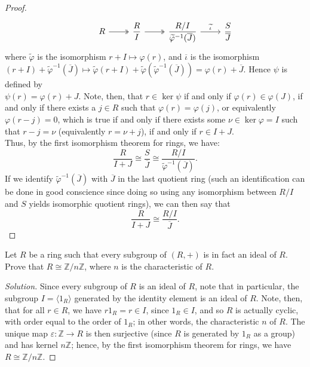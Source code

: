 \documentclass[12pt]{article}
\newenvironment{problem}[2][Problem]{\begin{trivlist}
\item[\hskip \labelsep {\bfseries #1}\hskip \labelsep {\bfseries #2.}]}{\end{trivlist}}
\newenvironment{solution}
  {\renewcommand\qedsymbol{$\blacksquare$}\begin{proof}[Solution]}
{\end{proof}}
\newenvironment{sproof}{
  \renewcommand\qedsymbol{$\square$}
  \begin{proof}
  }{
  \end{proof}
}
\theoremstyle{remark}
\begin{document}
\begin{enumerate}
\begin{sproof}
\[\begin{tikzcd}
      & R \ar[r, twoheadrightarrow] & \displaystyle{\frac{R}{I}}
          \ar[r, twoheadrightarrow] & \displaystyle{\frac{R/I}{\widetilde{\varphi}^{-1}(\overline{J})}}
          \ar{r}{\widetilde\iota} & \displaystyle{\frac{S}{\overline{J}}}
      \end{tikzcd}
      \]
      where $\widetilde\varphi$ is the isomorphism $r+I\mapsto\varphi(r)$, and
      $\overline\iota$ is the isomorphism \\
      $(r+I)+\widetilde\varphi^{-1}(\overline{J})
      \mapsto \widetilde\varphi(r+I) + \widetilde\varphi(\widetilde\varphi^{-1}(\overline{J}))
      = \varphi(r) + \overline{J}$.
      Hence $\psi$ is defined by \\ $\psi(r) = \varphi(r)+J$.
      Note, then, that $r\in\ker\psi$ if and only if $\varphi(r)\in\varphi(J)$, if and
      only if there exists a $j\in R$ such that $\varphi(r)=\varphi(j)$,
      or equivalently $\varphi(r-j)=0$, which is true if and only if
      there exists some $\nu\in\ker\varphi=I$ such that $r-j=\nu$ (equivalently $r=\nu+j$),
      if and only if $r\in I+J$.\\
        \indent Thus, by the first isomorphism theorem for rings, we have:
        \begin{equation*}
          \frac{R}{I+J} \cong \frac{S}{\overline{J}} 
          \cong \frac{R/I}{\widetilde\varphi^{-1}(\overline{J})}.
        \end{equation*}
        If we identify $\widetilde\varphi^{-1}(\overline{J})$ with $\overline{J}$ in the
        last quotient ring (such an identification can be done in good conscience
        since doing so using any isomorphism between $R/I$ and $S$ yields isomorphic 
        quotient rings), we can then say that
          \begin{equation*}
            \frac{R}{I+J} \cong \frac{R/I}{\overline{J}} .
          \end{equation*}
    \end{sproof}
\end{enumerate}

\newpage

\begin{problem}{3.4}
  Let $R$ be a ring such that every subgroup of $(R,+)$ is in fact an ideal of $R$.
  Prove that $R\cong\mathbb{Z}/n\mathbb{Z}$, where $n$ is the characteristic of $R$.
\end{problem}
\begin{solution}
  Since every subgroup of $R$ is an ideal of $R$, note that in particular, the subgroup
  $I=\langle1_R\rangle$ generated by the identity element is an ideal of $R$.
  Note, then, that for all $r\in R$, we have $r1_R=r\in I$, since
  $1_R\in I$, and so $R$ is actually cyclic, with order equal to the order of $1_R$; in other
  words, the characteristic $n$ of $R$.
  The unique map $\varepsilon:\mathbb{Z}\to R$ is then surjective (since $R$ is generated
  by $1_R$ as a group) and has kernel $n\mathbb{Z}$; hence, by the first isomorphism theorem
  for rings, we have $R\cong\mathbb{Z}/n\mathbb{Z}$.
\end{solution}
\end{document}
